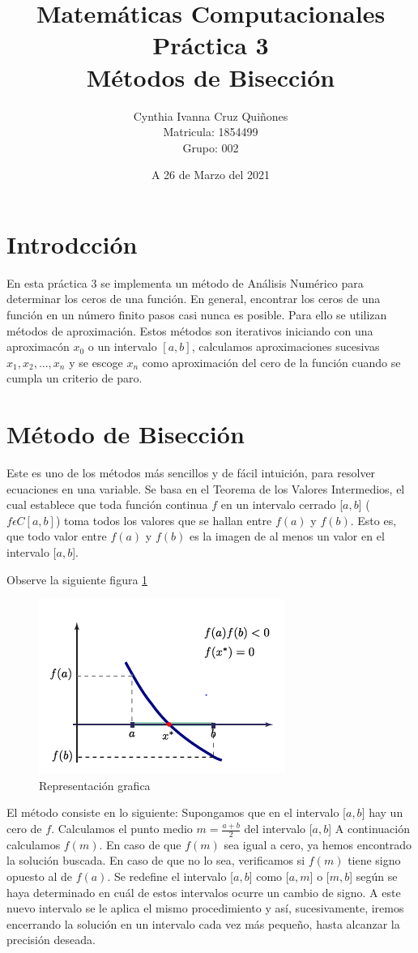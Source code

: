 \documentclass[12pt,a4paper]{article}
\author{Cynthia Ivanna Cruz Quiñones\\
Matricula: 1854499\\ Grupo: 002}
\title{Matemáticas Computacionales\\ Práctica 3\\
Métodos de Bisección}
\date{A 26 de Marzo del 2021}
\begin{document}
\maketitle
\newpage

\section{Introdcción}
En esta práctica 3 se implementa un método de Análisis Numérico para determinar los ceros de una función. En general, encontrar los ceros de una función en un número finito pasos casi nunca es posible. Para ello se utilizan métodos de aproximación. Estos métodos son iterativos iniciando con una aproximacón $x_{0}$ o un intervalo $[a, b]$, calculamos aproximaciones sucesivas $x_{1}, x_{2},..., x_{n}$ y se escoge $x_{n}$ como aproximación del cero de la función cuando se cumpla un criterio de paro. \citep{repositorio}


\section{Método de Bisección}
Este es uno de los métodos más sencillos y de fácil intuición, para resolver ecuaciones en una variable. Se basa en el Teorema de los Valores Intermedios, el cual establece que toda función continua $f$ en un intervalo cerrado [$a,b$] ($f \epsilon C[a,b]$) toma todos los valores que se hallan entre $f(a)$ y $f(b)$. Esto es, que todo valor entre $f(a)$ y $f(b)$ es la imagen de al menos un valor en el intervalo [$a,b$]. 

Observe la siguiente figura \ref{fig:MB}

\begin{figure}[h]
\centering
\includegraphics[scale=1.0]{MB}
\caption{Representación grafica}
\label{fig:MB}
\end{figure}

El método consiste en lo siguiente: Supongamos que en el intervalo [$a,b$] hay un cero de $f$. Calculamos el punto medio $m=\frac{a+b}{2}$ del intervalo [$a,b$] A continuación calculamos $f(m)$. En caso de que $f(m)$ sea igual a cero, ya hemos encontrado la solución buscada. En caso de que no lo sea, verificamos si $f(m)$ tiene signo opuesto al de $f(a)$. Se redefine el intervalo [$a,b$] como [$a,m$] o [$m,b$] según se haya determinado en cuál de estos intervalos ocurre un cambio de signo. A este nuevo intervalo se le aplica el mismo procedimiento y así, sucesivamente, iremos encerrando la solución en un intervalo cada vez más pequeño, hasta alcanzar la precisión deseada. 
\end{document}

